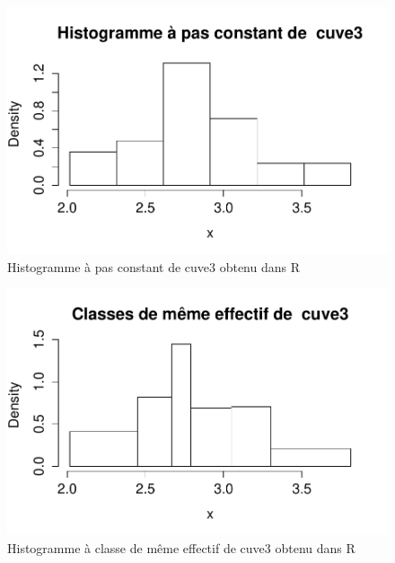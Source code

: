 \documentclass[a4paper,11pt]{article}
\begin{document}
\begin{enumerate}
\begin{figure}[t]
\centering
\includegraphics[width=1.0\textwidth]{figures/histopas_cuve3.pdf}
\caption{Histogramme à pas constant de cuve3 obtenu dans R}
\end{figure}

\begin{figure}[t]
\centering
\includegraphics[width=1.0\textwidth]{figures/histoeff_cuve3.pdf}
\caption{Histogramme à classe de même effectif de cuve3 obtenu dans R}
\end{figure}


\end{enumerate}






\end{document}
